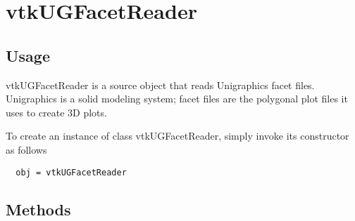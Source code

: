 \section{vtkUGFacetReader}

\subsection{Usage}

 vtkUGFacetReader is a source object that reads Unigraphics facet files.
 Unigraphics is a solid modeling system; facet files are the polygonal
 plot files it uses to create 3D plots.

To create an instance of class vtkUGFacetReader, simply
invoke its constructor as follows
\begin{verbatim}
  obj = vtkUGFacetReader
\end{verbatim}
\subsection{Methods}

